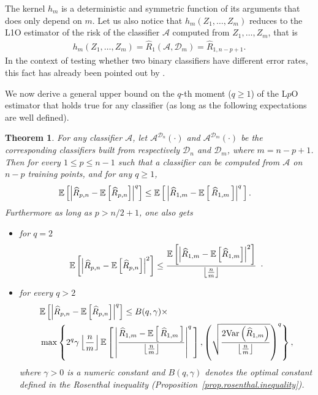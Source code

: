 \documentclass[twoside,11pt]{article}
\numberwithin{equation}{section}
\newcommand{\esp}[1]{\mathbb{E}\left[#1 \right]}
\newcommand{\floor}[1]{\left\lfloor #1 \right\rfloor}
\newcommand{\1}{\mathds{1}}%
\newcommand{\paren}[1]{\left( #1 \right)}
\newcommand{\croch}[1]{\left[\, #1 \,\right]}
\newcommand{\acc}[1]{\left\{ #1 \right\}}
\newcommand{\abs}[1]{\left\lvert #1 \right\rvert} %
\newcommand{\E}{\mathbb{E}}
\newcommand{\Var}{\mathrm{Var}}
\newcommand{\Rh}{\widehat{R}}
\newcommand{\D}{\mathcal{D}}
\newcommand{\Dn}{\mathcal{D}_n}
\newcommand{\A}{\mathcal{A}}
\numberwithin{equation}{section}
\theoremstyle{plain}
\newtheorem{thm}{Theorem}[section]
\begin{document}
%
The kernel $h_m$ is a deterministic and symmetric function of its arguments that does only depend on $m$.
%
Let us also notice that $h_m\paren{Z_{1},\ldots, Z_{m} }$ reduces to the L1O estimator of the risk of the classifier $\A$ computed from $Z_1,\ldots,Z_m$, that is
\begin{align}\label{eq.notation.LpO.Ustatistic}
  h_m\paren{Z_{1},\ldots, Z_{m} } = \Rh_1\paren{ \A,\D_m } = \Rh_{1,n-p+1} .
\end{align}
%
In the context of testing whether two binary classifiers have different error rates, this fact has already been pointed out by \cite{FHDBB:2013}.
%

\medskip

We now derive a general upper bound on the $q$-th moment ($q\geq 1$) of the L$p$O estimator that holds true for any classifier (as long as the following expectations are well defined).
%
\begin{thm}\label{Prop : upper.bound.lpo.loo}
For any classifier $\A$, let $\A^{\D_n}(\cdot)$ and $\A^{\D_m}(\cdot)$ be the corresponding classifiers built from respectively $\Dn $ and $\D_{m}$, where $ m = n-p+1$.
%
Then for every $1\leq p\leq n-1$ such that a classifier can be computed from $\A$ on $n-p$ training points, and for any $q\geq 1$,
%
\begin{eqnarray} \label{ineq.Lpo.Loo.moments.direct.quad}
& \esp{ \left| \Rh_{p,n} - \esp{ \Rh_{p,n} } \right|^q } \leq  \E\croch{ \abs{  \Rh_{1,m} - \E\croch{ \Rh_{1,m} } }^q } . \hfill
\end{eqnarray}
%
Furthermore as long as $p> n/2+1$, one also gets
\begin{itemize}
    \item for $q=2$
    \begin{align} \label{ineq.Lpo.Loo.moments.quad}
    \esp{ \left| \Rh_{p,n} - \esp{ \Rh_{p,n} } \right|^2 } \leq   \frac{  \esp{ \left| \Rh_{1,m} - \esp{ \Rh_{1,m} } \right|^2 }  }{\floor{ \frac{n}{m}}} \enspace\cdot \hfill
    \end{align}
%
%
    \item for every $q>2$
%
\begin{align} \label{ineq.Lpo.Loo.moments.larger.quad}
& \esp{ \left| \Rh_{p,n} - \esp{ \Rh_{p,n} } \right|^q } \leq  B(q,\gamma) \times  \hfill \nonumber \\
%
&\max\acc{ 2^{q}\gamma \floor{ \frac{n}{m}} \E\croch{ \abs{ \frac{ \Rh_{1,m} - \E\croch{ \Rh_{1,m} } }{\floor{ \frac{n}{m}}} }^q } , \paren{ \sqrt{ \frac{2
\Var\paren{  \Rh_{1,m} }}{ \floor{ \frac{n}{m}} } } }^q } , \hfill
\end{align}
where $\gamma>0$ is a numeric constant and $B(q,\gamma)$ denotes the optimal constant defined in the Rosenthal inequality (Proposition~\ref{prop.rosenthal.inequality}).
%
\end{itemize}
%
\end{thm}
\end{document}

